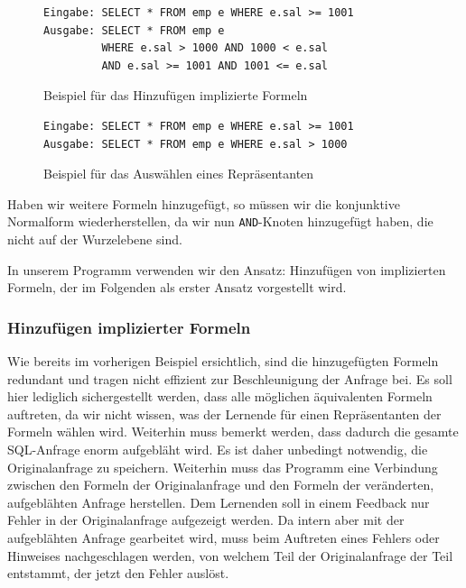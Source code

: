 \begin{figure}[H]
\centering
\begin{verbatim}
Eingabe: SELECT * FROM emp e WHERE e.sal >= 1001
Ausgabe: SELECT * FROM emp e 
         WHERE e.sal > 1000 AND 1000 < e.sal
         AND e.sal >= 1001 AND 1001 <= e.sal
\end{verbatim}
\caption{Beispiel für das Hinzufügen implizierte Formeln}
\label{fig:sampleadd}
\end{figure}

\begin{figure}[H]
\centering
\begin{verbatim}
Eingabe: SELECT * FROM emp e WHERE e.sal >= 1001
Ausgabe: SELECT * FROM emp e WHERE e.sal > 1000
\end{verbatim}
\caption{Beispiel für das Auswählen eines Repräsentanten}
\label{fig:samplerep}
\end{figure}

Haben wir weitere Formeln hinzugefügt, so müssen wir die konjunktive Normalform wiederherstellen, da wir nun \verb|AND|-Knoten hinzugefügt haben, die nicht auf der Wurzelebene sind. 

In unserem Programm verwenden wir den Ansatz: Hinzufügen von implizierten Formeln, der im Folgenden als erster Ansatz vorgestellt wird.

\subsubsection{Hinzufügen implizierter Formeln}
\label{subsubsec:implicitformulas}

Wie bereits im vorherigen Beispiel ersichtlich, sind die hinzugefügten Formeln redundant und tragen nicht effizient zur Beschleunigung der Anfrage bei. Es soll hier lediglich sichergestellt werden, dass alle möglichen äquivalenten Formeln auftreten, da wir nicht wissen, was der Lernende für einen Repräsentanten der Formeln wählen wird. Weiterhin muss bemerkt werden, dass dadurch die gesamte SQL-Anfrage enorm aufgebläht wird. Es ist daher unbedingt notwendig, die Originalanfrage zu speichern. Weiterhin muss das Programm eine Verbindung zwischen den Formeln der Originalanfrage und den Formeln der veränderten, aufgeblähten Anfrage herstellen. Dem Lernenden soll in einem Feedback nur Fehler in der Originalanfrage aufgezeigt werden. Da intern aber mit der aufgeblähten Anfrage gearbeitet wird, muss beim Auftreten eines Fehlers oder Hinweises nachgeschlagen werden, von welchem Teil der Originalanfrage der Teil entstammt, der jetzt den Fehler auslöst.

